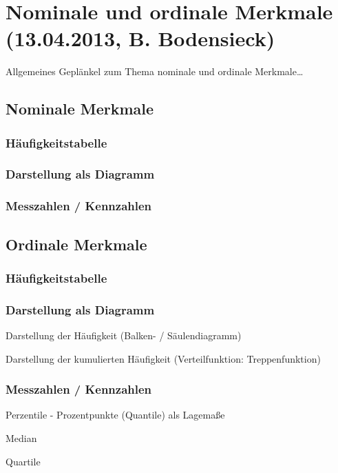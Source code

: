 \section{Nominale und ordinale Merkmale (13.04.2013, B. Bodensieck)}
Allgemeines Geplänkel zum Thema nominale und ordinale Merkmale\ldots


\subsection{Nominale Merkmale}

\subsubsection{Häufigkeitstabelle}

\subsubsection{Darstellung als Diagramm}

\subsubsection{Messzahlen / Kennzahlen}


\subsection{Ordinale Merkmale}

\subsubsection{Häufigkeitstabelle}

\subsubsection{Darstellung als Diagramm}
Darstellung der Häufigkeit (Balken- / Säulendiagramm)

Darstellung der kumulierten Häufigkeit (Verteilfunktion: Treppenfunktion)

\subsubsection{Messzahlen / Kennzahlen}

Perzentile - Prozentpunkte (Quantile) als Lagemaße

Median
 
Quartile
